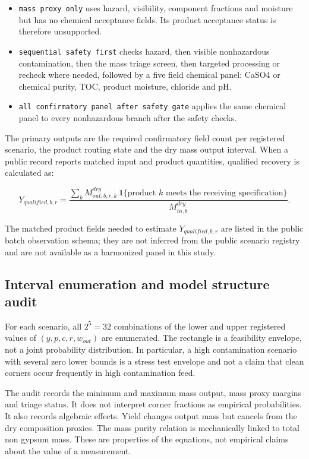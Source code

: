\documentclass[pdflatex,sn-basic]{sn-jnl}
\begin{document}
\begin{itemize}

\item
  \texttt{mass\ proxy\ only} uses hazard, visibility, component fractions and moisture but has no chemical acceptance fields. Its product acceptance status is therefore unsupported.
\item
  \texttt{sequential\ safety\ first} checks hazard, then visible nonhazardous contamination, then the mass triage screen, then targeted processing or recheck where needed, followed by a five field chemical panel: CaSO4 or chemical purity, TOC, product moisture, chloride and pH.
\item
  \texttt{all\ confirmatory\ panel\ after\ safety\ gate} applies the same chemical panel to every nonhazardous branch after the safety checks.
\end{itemize}

The primary outputs are the required confirmatory field count per registered scenario, the product routing state and the dry mass output interval. When a public record reports matched input and product quantities, qualified recovery is calculated as:

\[
Y_{qualified,b,r}=\frac{\sum_k M^{dry}_{out,b,r,k}\,\mathbf{1}\{\text{product }k\text{ meets the receiving specification}\}}{M^{dry}_{in,b}}.
\]

The matched product fields needed to estimate \(Y_{qualified,b,r}\) are listed in the public batch observation schema; they are not inferred from the public scenario registry and are not available as a harmonized panel in this study.

\subsection{Interval enumeration and model structure audit}\label{interval-enumeration-and-model-structure-audit}

For each scenario, all \(2^5=32\) combinations of the lower and upper registered values of \((y,p,c,r,w_{out})\) are enumerated. The rectangle is a feasibility envelope, not a joint probability distribution. In particular, a high contamination scenario with several zero lower bounds is a stress test envelope and not a claim that clean corners occur frequently in high contamination feed.

The audit records the minimum and maximum mass output, mass proxy margins and triage status. It does not interpret corner fractions as empirical probabilities. It also records algebraic effects. Yield changes output mass but cancels from the dry composition proxies. The mass purity relation is mechanically linked to total non gypsum mass. These are properties of the equations, not empirical claims about the value of a measurement.
\end{document}
